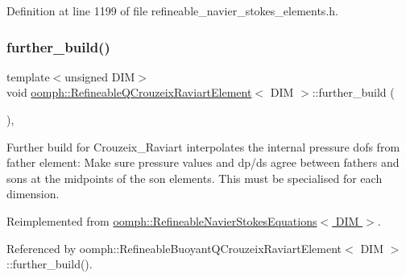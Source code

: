 Definition at line 1199 of file refineable\+\_\+navier\+\_\+stokes\+\_\+elements.\+h.

\mbox{\label{classoomph_1_1RefineableQCrouzeixRaviartElement_a96c176f20661f2d18a53a434b0e21b70}} 
\subsubsection{\texorpdfstring{further\+\_\+build()}{further\_build()}\hspace{0.1cm}{\footnotesize\ttfamily [1/3]}}
{\footnotesize\ttfamily template$<$unsigned D\+IM$>$ \\
void \hyperlink{classoomph_1_1RefineableQCrouzeixRaviartElement}{oomph\+::\+Refineable\+Q\+Crouzeix\+Raviart\+Element}$<$ D\+IM $>$\+::further\+\_\+build (\begin{DoxyParamCaption}{ }\end{DoxyParamCaption})\hspace{0.3cm}{\ttfamily [inline]}, {\ttfamily [virtual]}}

Further build for Crouzeix\+\_\+\+Raviart interpolates the internal pressure dofs from father element\+: Make sure pressure values and dp/ds agree between fathers and sons at the midpoints of the son elements. This must be specialised for each dimension. 

Reimplemented from \hyperlink{classoomph_1_1RefineableNavierStokesEquations_a7afd6250585ea597c3df65b8c7744da4}{oomph\+::\+Refineable\+Navier\+Stokes\+Equations$<$ D\+I\+M $>$}.



Referenced by oomph\+::\+Refineable\+Buoyant\+Q\+Crouzeix\+Raviart\+Element$<$ D\+I\+M $>$\+::further\+\_\+build().

\mbox{\label{classoomph_1_1RefineableQCrouzeixRaviartElement_add29acd61fe84a78c19e50096ed944dc}} 
